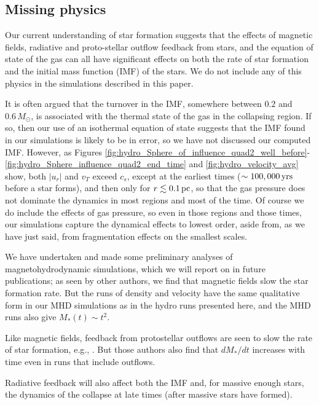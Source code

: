 \documentclass[../dissertation.tex]{subfiles}
\begin{document}
\subsection{Missing physics} \label{subsec:missing_physics}
Our current understanding of star formation suggests that the effects of magnetic 
fields, radiative and proto-stellar outflow feedback from stars, and the equation 
of state of the gas can 
all have significant effects on both the rate of star formation and the initial 
mass function (IMF) of the stars. We do not include any of this physics in the simulations
described in this paper. 

It is often argued that the turnover in the IMF, somewhere between $0.2$ and
 $0.6\,M_\odot$, is associated with the thermal state of the gas in the collapsing
region. If so, then our use of an isothermal equation of state suggests that the IMF found in our simulations is likely to be in error, so we have not discussed our computed IMF. However, as Figures \ref{fig:hydro_Sphere_of_influence_quad2_well_before}-\ref{fig:hydro_Sphere_influence_quad2_end_time} and \ref{fig:hydro_velocity_avg} show, both $|u_r|$ and $v_T$ exceed $c_s$, except at the earliest times ($\sim 100,000\,\rm yrs$ before a star forms), and then only for $r\lesssim0.1\,\rm pc$, so that the gas pressure does not dominate the dynamics in most regions and most of the time. Of course we do include the effects of gas pressure, so even in those regions and those times, our simulations capture the dynamical effects to lowest order, aside from, as we have just said, from fragmentation effects on the smallest scales. 

We have undertaken and made some preliminary analyses of magnetohydrodynamic simulations, which we will report on in future publications; as seen by other authors, we find that magnetic fields slow the star formation rate. But the runs of density and velocity have the same qualitative form in our MHD simulations as in the hydro runs presented here, and the MHD runs also give $M_*(t)\sim t^2$. 

Like magnetic fields, feedback from protostellar outflows are seen to slow the rate of star formation, e.g., \citet{2010ApJ...709...27W,2015MNRAS.450.4035F}. But those authors also find that $dM_*/dt$ increases with time even in runs that include outflows. 

Radiative feedback will also affect both the IMF and, for massive enough stars, the dynamics of the collapse at late times (after massive stars have formed). 
\end{document}
